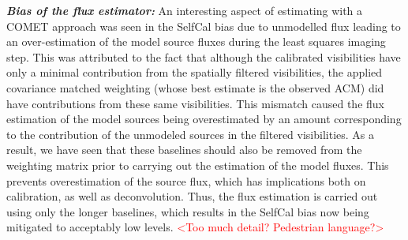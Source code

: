 \documentclass{aa}
\begin{document}
\textbf{\emph{Bias  of the  flux  estimator:}}\emph{ }An  interesting aspect  of
estimating with a COMET approach was  seen in the SelfCal bias due to unmodelled
flux leading to  an over-estimation of the model source  fluxes during the least
squares  imaging  step.  This was  attributed  to  the  fact that  although  the
calibrated  visibilities have  only a  minimal contribution  from  the spatially
filtered  visibilities, the  applied  covariance matched  weighting (whose  best
estimate  is  the   observed  ACM)  did  have  contributions   from  these  same
visibilities.  This mismatch  caused the  flux estimation  of the  model sources
being  overestimated by  an  amount  corresponding to  the  contribution of  the
unmodeled sources in  the filtered visibilities. As a result,  we have seen that
these  baselines should  also  be removed  from  the weighting  matrix prior  to
carrying out the estimation of the model fluxes. This prevents overestimation of
the  source  flux,  which has  implications  both  on  calibration, as  well  as
deconvolution. Thus,  the flux estimation is  carried out using  only the longer
baselines, which results  in the SelfCal bias now  being mitigated to acceptably
low levels. \textcolor{red}{<Too much detail?  Pedestrian language?>}
\end{document}
